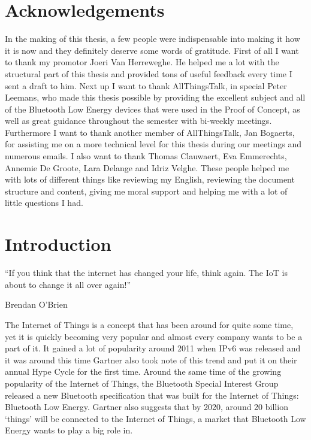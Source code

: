 \documentclass[pdftex,a4paper,12pt,twoside]{report}
\newcommand{\emptypage}{
\newpage
\thispagestyle{empty}
\mbox{}
\newpage
}
\begin{document}
\chapter*{Acknowledgements}
\label{ch:acknowledgements}
In the making of this thesis, a few people were indispensable into making it how it is now and they definitely deserve some words of gratitude. First of all I want to thank my promotor Joeri Van Herreweghe. He helped me a lot with the structural part of this thesis and provided tons of useful feedback every time I sent a draft to him. Next up I want to thank AllThingsTalk, in special Peter Leemans, who made this thesis possible by providing the excellent subject and all of the Bluetooth Low Energy devices that were used in the Proof of Concept, as well as great guidance throughout the semester with bi-weekly meetings. Furthermore I want to thank another member of AllThingsTalk, Jan Bogaerts, for assisting me on a more technical level for this thesis during our meetings and numerous emails. I also want to thank Thomas Clauwaert, Eva Emmerechts, Annemie De Groote, Lara Delange and Idriz Velghe. These people helped me with lots of different things like reviewing my English, reviewing the document structure and content, giving me moral support and helping me with a lot of little questions I had.

\tableofcontents

\emptypage


\chapter{Introduction}
\label{ch:introduction}
\epigraph{``If you think that the internet has changed your life, think again. The IoT is about to change it all over again!''}{Brendan O'Brien}
The Internet of Things is a concept that has been around for quite some time, yet it is quickly becoming very popular and almost every company wants to be a part of it. It gained a lot of popularity around 2011 when IPv6 was released and it was around this time Gartner \citep{gartner2012} also took note of this trend and put it on their annual Hype Cycle for the first time. Around the same time of the growing popularity of the Internet of Things, the Bluetooth Special Interest Group released a new Bluetooth specification that was built for the Internet of Things: Bluetooth Low Energy. Gartner \citep{gartner2015} also suggests that by 2020, around 20 billion `things' will be connected to the Internet of Things, a market that Bluetooth Low Energy wants to play a big role in.
\end{document}
